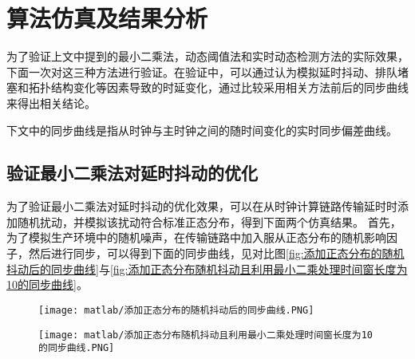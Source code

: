 \section{算法仿真及结果分析}
为了验证上文中提到的最小二乘法，动态阈值法和实时动态检测方法的实际效果，下面一次对这三种方法进行验证。在验证中，可以通过认为模拟延时抖动、排队堵塞和拓扑结构变化等因素导致的时延变化，通过比较采用相关方法前后的同步曲线来得出相关结论。

下文中的同步曲线是指从时钟与主时钟之间的随时间变化的实时同步偏差曲线。

\subsection{验证最小二乘法对延时抖动的优化}
为了验证最小二乘法对延时抖动的优化效果，可以在从时钟计算链路传输延时时添加随机扰动，并模拟该扰动符合标准正态分布，得到下面两个仿真结果。
首先，为了模拟生产环境中的随机噪声，在传输链路中加入服从正态分布的随机影响因子，然后进行同步，可以得到下面的同步曲线，见对比图\ref{fig:添加正态分布的随机抖动后的同步曲线}与\ref{fig:添加正态分布随机抖动且利用最小二乘处理时间窗长度为10的同步曲线}。
\begin{figure}[!hbp]
  \centering
  \begin{minipage}[b]{1\textwidth}
    \captionstyle{\centering}
    \centering
    \texttt{[image: matlab/添加正态分布的随机抖动后的同步曲线.PNG]}
  \end{minipage}     
\end{figure}

\begin{figure}[htbp]
  \centering
  \begin{minipage}[b]{1\textwidth}
    \captionstyle{\centering}
    \centering
    \texttt{[image: matlab/添加正态分布随机抖动且利用最小二乘处理时间窗长度为10的同步曲线.PNG]}
  \end{minipage}     
\end{figure}

